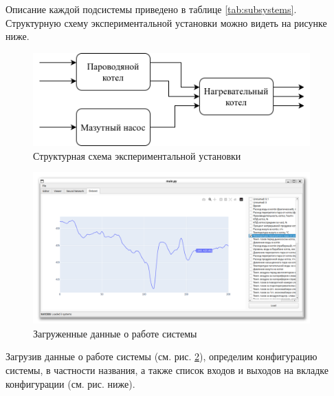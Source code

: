 Описание каждой подсистемы приведено в таблице \ref{tab:subsystems}. Структурную схему экспериментальной установки можно видеть на рисунке ниже. 

\begin{figure}[H]
  \begin{center}
    \includegraphics[width=0.95\textwidth]{figures/subsystem_diagram.png}
  \end{center}
  \caption{Структурная схема экспериментальной установки}\label{fig:subsystem_diagram}
\end{figure}

\begin{figure}[H]
  \begin{center}
    \includegraphics[width=0.95\textwidth]{figures/modules/loader.png}
  \end{center}
  \caption{Загруженные данные о работе системы}\label{fig:test:loaded_data}
\end{figure}

Загрузив данные о работе системы (см. рис. \ref{fig:test:loaded_data}), определим конфигурацию системы, в частности названия, а также список входов и выходов на вкладке конфигурации (см. рис. ниже).

